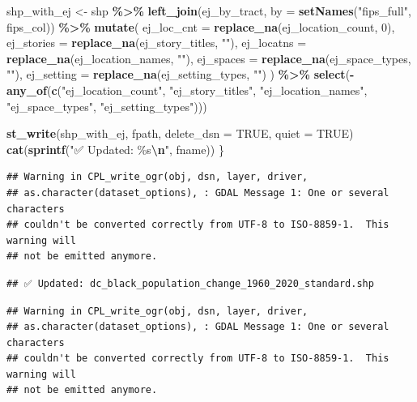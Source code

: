 \documentclass[
]{article}
\newenvironment{Shaded}{\begin{snugshade}}{\end{snugshade}}
\newcommand{\AttributeTok}[1]{\textcolor[rgb]{0.13,0.29,0.53}{#1}}
\newcommand{\ConstantTok}[1]{\textcolor[rgb]{0.56,0.35,0.01}{#1}}
\newcommand{\DecValTok}[1]{\textcolor[rgb]{0.00,0.00,0.81}{#1}}
\newcommand{\FunctionTok}[1]{\textcolor[rgb]{0.13,0.29,0.53}{\textbf{#1}}}
\newcommand{\NormalTok}[1]{#1}
\newcommand{\OtherTok}[1]{\textcolor[rgb]{0.56,0.35,0.01}{#1}}
\newcommand{\SpecialCharTok}[1]{\textcolor[rgb]{0.81,0.36,0.00}{\textbf{#1}}}
\newcommand{\StringTok}[1]{\textcolor[rgb]{0.31,0.60,0.02}{#1}}
\begin{document}
\begin{Shaded}
\begin{Highlighting}[]
\NormalTok{  shp\_with\_ej }\OtherTok{\textless{}{-}}\NormalTok{ shp }\SpecialCharTok{\%\textgreater{}\%}
    \FunctionTok{left\_join}\NormalTok{(ej\_by\_tract, }\AttributeTok{by =} \FunctionTok{setNames}\NormalTok{(}\StringTok{"fips\_full"}\NormalTok{, fips\_col)) }\SpecialCharTok{\%\textgreater{}\%}
    \FunctionTok{mutate}\NormalTok{(}
      \AttributeTok{ej\_loc\_cnt =} \FunctionTok{replace\_na}\NormalTok{(ej\_location\_count, }\DecValTok{0}\NormalTok{),}
      \AttributeTok{ej\_stories =} \FunctionTok{replace\_na}\NormalTok{(ej\_story\_titles, }\StringTok{""}\NormalTok{),}
      \AttributeTok{ej\_locatns =} \FunctionTok{replace\_na}\NormalTok{(ej\_location\_names, }\StringTok{""}\NormalTok{),}
      \AttributeTok{ej\_spaces  =} \FunctionTok{replace\_na}\NormalTok{(ej\_space\_types, }\StringTok{""}\NormalTok{),}
      \AttributeTok{ej\_setting =} \FunctionTok{replace\_na}\NormalTok{(ej\_setting\_types, }\StringTok{""}\NormalTok{)}
\NormalTok{    ) }\SpecialCharTok{\%\textgreater{}\%}
    \FunctionTok{select}\NormalTok{(}\SpecialCharTok{{-}}\FunctionTok{any\_of}\NormalTok{(}\FunctionTok{c}\NormalTok{(}\StringTok{"ej\_location\_count"}\NormalTok{, }\StringTok{"ej\_story\_titles"}\NormalTok{, }
                     \StringTok{"ej\_location\_names"}\NormalTok{, }\StringTok{"ej\_space\_types"}\NormalTok{, }\StringTok{"ej\_setting\_types"}\NormalTok{)))}
  
  \FunctionTok{st\_write}\NormalTok{(shp\_with\_ej, fpath, }\AttributeTok{delete\_dsn =} \ConstantTok{TRUE}\NormalTok{, }\AttributeTok{quiet =} \ConstantTok{TRUE}\NormalTok{)}
  \FunctionTok{cat}\NormalTok{(}\FunctionTok{sprintf}\NormalTok{(}\StringTok{"✅ Updated: \%s}\SpecialCharTok{\textbackslash{}n}\StringTok{"}\NormalTok{, fname))}
\NormalTok{\}}
\end{Highlighting}
\end{Shaded}

\begin{verbatim}
## Warning in CPL_write_ogr(obj, dsn, layer, driver,
## as.character(dataset_options), : GDAL Message 1: One or several characters
## couldn't be converted correctly from UTF-8 to ISO-8859-1.  This warning will
## not be emitted anymore.
\end{verbatim}

\begin{verbatim}
## ✅ Updated: dc_black_population_change_1960_2020_standard.shp
\end{verbatim}

\begin{verbatim}
## Warning in CPL_write_ogr(obj, dsn, layer, driver,
## as.character(dataset_options), : GDAL Message 1: One or several characters
## couldn't be converted correctly from UTF-8 to ISO-8859-1.  This warning will
## not be emitted anymore.
\end{verbatim}
\end{document}

